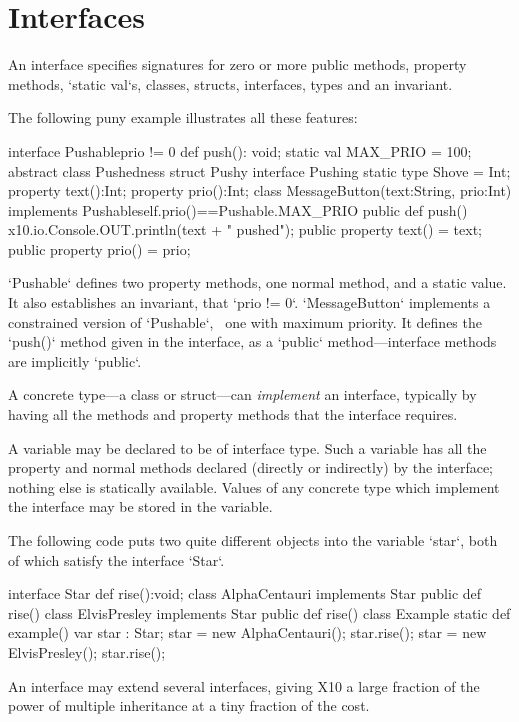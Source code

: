 \chapter{Interfaces}
\label{XtenInterfaces}

An interface specifies signatures for zero or more public methods, property
methods,
\xcd`static val`s, 
classes, structs, interfaces, types
and an invariant. 

The following puny example illustrates all these features: 
\begin{xten}
interface Pushable{prio != 0} {
  def push(): void;
  static val MAX_PRIO = 100;
  abstract class Pushedness{}
  struct Pushy{}
  interface Pushing{}
  static type Shove = Int;
  property text():Int;
  property prio():Int;
}
class MessageButton(text:String, prio:Int)
  implements Pushable{self.prio()==Pushable.MAX_PRIO} {
  public def push() { 
    x10.io.Console.OUT.println(text + " pushed");
  }
  public property text() = text;
  public property prio() = prio;
}
\end{xten}
%
\noindent
\xcd`Pushable` defines two property methods, one normal method, and a static
value.  It also 
establishes an invariant, that \xcd`prio != 0`. 
\xcd`MessageButton` implements a constrained version of \xcd`Pushable`,
\viz\ one with maximum priority.  It
defines the \xcd`push()` method given in the interface, as a \xcd`public`
method---interface methods are implicitly \xcd`public`.

A concrete type---a class or struct---can {\em implement} an interface,
typically by having all the methods and property methods that the interface
requires.

A variable may be declared to be of interface type.  Such a variable has all
the property and normal methods declared (directly or indirectly) by the
interface; 
nothing else is statically available.  Values of any concrete type which
implement the interface may be stored in the variable.  

\begin{ex}
The following code puts two quite different objects into the variable
\xcd`star`, both of which satisfy the interface \xcd`Star`.
\begin{xten}
interface Star { def rise():void; }
class AlphaCentauri implements Star {
   public def rise() {}
}
class ElvisPresley implements Star {
   public def rise() {}
}
class Example {
   static def example() {
      var star : Star;
      star = new AlphaCentauri();
      star.rise();
      star = new ElvisPresley();
      star.rise();
   }
}
\end{xten}
%
\end{ex}
An interface may extend several interfaces, giving
X10 a large fraction of the power of multiple inheritance at a tiny fraction
of the cost.

